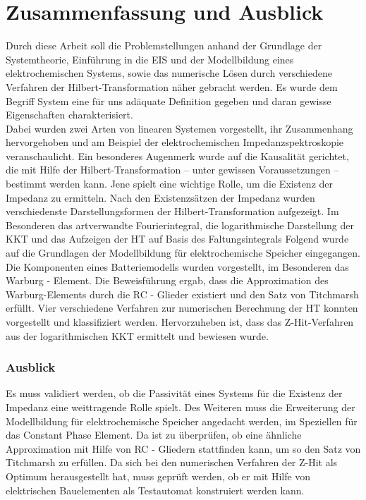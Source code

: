 \chapter{Zusammenfassung und Ausblick}
Durch diese Arbeit soll die Problemstellungen anhand der Grundlage der Systemtheorie, Einführung in die EIS und der Modellbildung eines elektrochemischen Systems, sowie das numerische Lösen durch verschiedene Verfahren der Hilbert-Transformation näher gebracht werden. Es wurde dem Begriff System eine für uns adäquate Definition gegeben und daran gewisse Eigenschaften charakterisiert.\\
Dabei wurden zwei Arten von linearen Systemen vorgestellt, ihr Zusammenhang hervorgehoben und am Beispiel der elektrochemischen Impedanzspektroskopie veranschaulicht. Ein besonderes Augenmerk wurde auf die Kausalität gerichtet, die mit Hilfe der Hilbert-Transformation – unter gewissen Voraussetzungen – bestimmt werden kann. Jene spielt eine wichtige Rolle, um die Existenz der Impedanz zu ermitteln.
Nach den Existenzsätzen der Impedanz wurden verschiedenste Darstellungsformen der Hilbert-Transformation aufgezeigt. Im Besonderen das artverwandte Fourierintegral, die logarithmische Darstellung der KKT und das Aufzeigen der HT auf Basis des Faltungsintegrals
Folgend wurde auf die Grundlagen der Modellbildung für elektrochemische Speicher eingegangen. Die Komponenten eines Batteriemodells wurden vorgestellt, im Besonderen das Warburg - Element. Die Beweisführung ergab, dass die Approximation des Warburg-Elements durch die RC - Glieder existiert und den Satz von Titchmarsh erfüllt.  
Vier verschiedene Verfahren zur numerischen Berechnung der HT konnten vorgestellt und klassifiziert werden. Hervorzuheben ist, dass das Z-Hit-Verfahren aus der logarithmischen KKT ermittelt und bewiesen wurde.
\subsection{Ausblick}
Es muss validiert werden, ob die Passivität eines Systems für die Existenz der Impedanz eine weittragende Rolle spielt. Des Weiteren muss die Erweiterung der Modellbildung für elektrochemische Speicher angedacht werden, im Speziellen für das Constant Phase Element. Da ist zu überprüfen, ob eine ähnliche Approximation mit Hilfe von RC - Gliedern stattfinden kann, um so den Satz von Titchmarsh zu erfüllen. 
Da sich bei den numerischen Verfahren der Z-Hit als Optimum herausgestellt hat, muss geprüft werden, ob er mit Hilfe von elektrischen Bauelementen als Testautomat konstruiert werden kann.